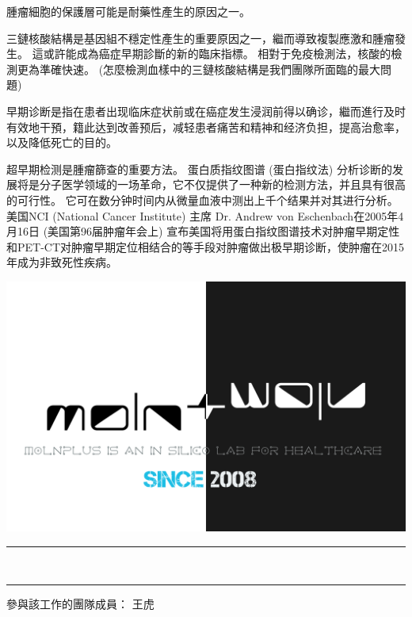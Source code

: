 \documentclass[10pt,a4paper]{article}
\newcommand{\HorRule}[1]{\noindent\rule{\linewidth}{#1}} %
\begin{document}
\begin{multicols}{2}
腫瘤細胞的保護層可能是耐藥性產生的原因之一。

三鏈核酸結構是基因組不穩定性產生的重要原因之一，繼而導致複製應激和腫瘤發生。
這或許能成為癌症早期診斷的新的臨床指標。
相對于免疫檢測法，核酸的檢測更為準確快速。
(怎麼檢測血樣中的三鏈核酸結構是我們團隊所面臨的最大問題)

早期诊断是指在患者出现临床症状前或在癌症发生浸润前得以确诊，繼而進行及时有效地干預，籍此达到改善预后，减轻患者痛苦和精神和经济负担，提高治愈率，以及降低死亡的目的。

超早期检测是腫瘤篩查的重要方法。
蛋白质指纹图谱 (蛋白指纹法) 分析诊断的发展将是分子医学领域的一场革命，它不仅提供了一种新的检测方法，并且具有很高的可行性。
它可在数分钟时间内从微量血液中测出上千个结果并对其进行分析。
美国NCI (National Cancer Institute) 主席 Dr. Andrew von Eschenbach在2005年4月16日 (美国第96届肿瘤年会上) 宣布美国将用蛋白指纹图谱技术对肿瘤早期定性和PET-CT对肿瘤早期定位相结合的等手段对肿瘤做出极早期诊断，使肿瘤在2015年成为非致死性疾病。



\begin{center}
\includegraphics[width=1\linewidth]{molnplus.png} %
\end{center}

\end{multicols}


\begin{center}

\noindent\HorRule{3pt} \\[-0.75\baselineskip] %
\HorRule{1pt} %

參與該工作的團隊成員：
王虎
\end{center}

\newpage



\end{document}

